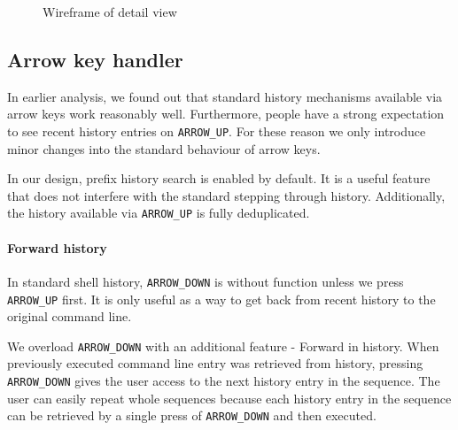 \begin{figure}[h!]
  \caption{Wireframe of detail view}
  \label{wireframe-detail}
\end{figure}


\subsection{Arrow key handler}

In earlier analysis, we found out that standard history mechanisms available via arrow keys work reasonably well. Furthermore, people have a strong expectation to see recent history entries on \verb|ARROW_UP|. 
For these reason we only introduce minor changes into the standard behaviour of arrow keys.


In our design, prefix history search is enabled by default. It is a useful feature that does not interfere with the standard stepping through history. Additionally, the history available via \verb|ARROW_UP| is fully deduplicated.

\paragraph{Forward history}

In standard shell history, \verb|ARROW_DOWN| is without function unless we press \verb|ARROW_UP| first. It is only useful as a way to get back from recent history to the original command line.

We overload \verb|ARROW_DOWN| with an additional feature - Forward in history. When previously executed command line entry was retrieved from history, pressing \verb|ARROW_DOWN| gives the user access to the next history entry in the sequence. 
The user can easily repeat whole sequences because each history entry in the sequence can be retrieved by a single press of \verb|ARROW_DOWN| and then executed. 


